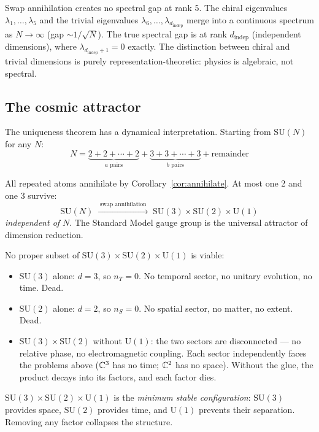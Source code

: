 \begin{remark}
Swap annihilation creates no spectral gap at rank 5. The chiral eigenvalues $\lambda_1, \ldots, \lambda_5$ and the trivial eigenvalues $\lambda_6, \ldots, \lambda_{d_\text{indep}}$ merge into a continuous spectrum as $N \to \infty$ (gap $\sim 1/\sqrt{N}$). The true spectral gap is at rank $d_\text{indep}$ (independent dimensions), where $\lambda_{d_\text{indep}+1} = 0$ exactly. The distinction between chiral and trivial dimensions is purely representation-theoretic: physics is algebraic, not spectral.
\end{remark}

\subsection{The cosmic attractor}

The uniqueness theorem has a dynamical interpretation. Starting from $\text{SU}(N)$ for any $N$:
\begin{equation}
N = \underbrace{2 + 2 + \cdots + 2}_{a\text{ pairs}} + \underbrace{3 + 3 + \cdots + 3}_{b\text{ pairs}} + \text{remainder}
\end{equation}

All repeated atoms annihilate by Corollary~\ref{cor:annihilate}. At most one 2 and one 3 survive:
\begin{equation}
\text{SU}(N) \;\xrightarrow{\;\text{swap annihilation}\;}\; \text{SU}(3) \times \text{SU}(2) \times \text{U}(1)
\end{equation}
\emph{independent of $N$}. The Standard Model gauge group is the universal attractor of dimension reduction.

\begin{remark}
No proper subset of $\text{SU}(3) \times \text{SU}(2) \times \text{U}(1)$ is viable:
\begin{itemize}
\item $\text{SU}(3)$ alone: $d = 3$, so $n_T = 0$. No temporal sector, no unitary evolution, no time. Dead.
\item $\text{SU}(2)$ alone: $d = 2$, so $n_S = 0$. No spatial sector, no matter, no extent. Dead.
\item $\text{SU}(3) \times \text{SU}(2)$ without $\text{U}(1)$: the two sectors are disconnected --- no relative phase, no electromagnetic coupling. Each sector independently faces the problems above ($\mathbb{C}^3$ has no time; $\mathbb{C}^2$ has no space). Without the glue, the product decays into its factors, and each factor dies.
\end{itemize}
$\text{SU}(3) \times \text{SU}(2) \times \text{U}(1)$ is the \emph{minimum stable configuration}: $\text{SU}(3)$ provides space, $\text{SU}(2)$ provides time, and $\text{U}(1)$ prevents their separation. Removing any factor collapses the structure.
\end{remark}

